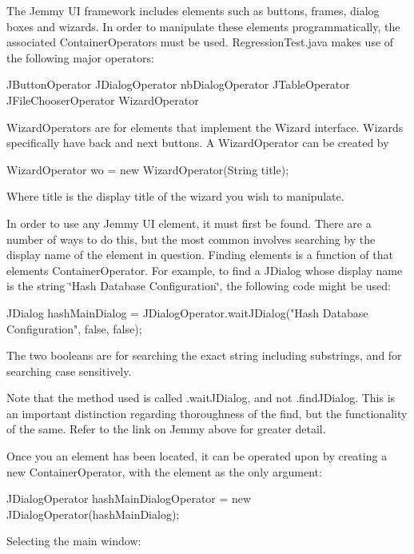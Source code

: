 The Jemmy UI framework includes elements such as buttons, frames, dialog boxes and wizards. In order to manipulate these elements programmatically, the associated Container\+Operators must be used. Regression\+Test.\+java makes use of the following major operators\+: \begin{DoxyVerb}JButtonOperator
JDialogOperator
nbDialogOperator
JTableOperator
JFileChooserOperator
WizardOperator
\end{DoxyVerb}


Wizard\+Operators are for elements that implement the Wizard interface. Wizards specifically have back and next buttons. A Wizard\+Operator can be created by \begin{DoxyVerb}WizardOperator wo = new WizardOperator(String title);
\end{DoxyVerb}


Where title is the display title of the wizard you wish to manipulate.

In order to use any Jemmy UI element, it must first be found. There are a number of ways to do this, but the most common involves searching by the display name of the element in question. Finding elements is a function of that elements Container\+Operator. For example, to find a J\+Dialog whose display name is the string \char`\"{}\+Hash Database Configuration\char`\"{}, the following code might be used\+: \begin{DoxyVerb}JDialog hashMainDialog =  JDialogOperator.waitJDialog("Hash Database Configuration", false, false);
\end{DoxyVerb}


The two booleans are for searching the exact string including substrings, and for searching case sensitively.

Note that the method used is called \textquotesingle{}.wait\+J\+Dialog\textquotesingle{}, and not \textquotesingle{}.find\+J\+Dialog\textquotesingle{}. This is an important distinction regarding thoroughness of the find, but the functionality of the same. Refer to the link on Jemmy above for greater detail.

Once you an element has been located, it can be operated upon by creating a new Container\+Operator, with the element as the only argument\+: \begin{DoxyVerb}JDialogOperator hashMainDialogOperator = new JDialogOperator(hashMainDialog);
\end{DoxyVerb}


Selecting the main window\+:

